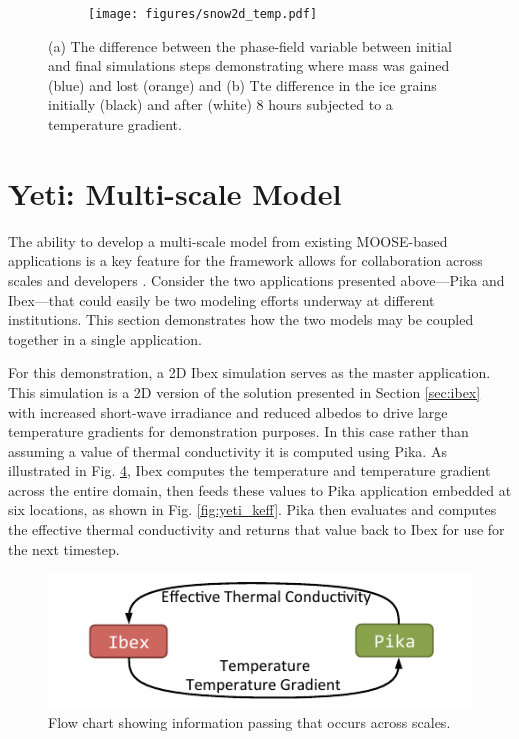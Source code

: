 \begin{figure}
\begin{subfigure}{0.44\linewidth}
  \caption{}
  \label{fig:snow2d:diff}
\end{subfigure}
\hfill
\begin{subfigure}{0.53\linewidth}
  \texttt{[image: figures/snow2d\_temp.pdf]}
  \caption{}
  \label{fig:snow2d:grains}
\end{subfigure}
\caption{(a) The difference between the phase-field variable between initial and final simulations steps demonstrating where mass was gained (blue) and lost (orange) and (b) Tte difference in the ice grains initially (black) and after (white) 8 hours subjected to a  temperature gradient.}
\end{figure}


\section{Yeti: Multi-scale Model}\label{sec:yeti}
The ability to develop a multi-scale model from existing MOOSE-based applications is a key feature for the framework allows for collaboration across scales and developers \citet{gaston2014physics}. Consider the two applications presented above---Pika and Ibex---that could easily be two modeling efforts underway at different institutions. This section demonstrates how the two models may be coupled together in a single application.

For this demonstration, a 2D Ibex simulation serves as the master application. This simulation is a 2D version of the solution presented in Section \ref{sec:ibex} with increased short-wave irradiance and reduced albedos to drive large temperature gradients for demonstration purposes. In this case rather than assuming a value of thermal conductivity it is computed using Pika. As illustrated in Fig. \ref{fig:yeti_flow}, Ibex computes the temperature and temperature gradient across the entire domain, then feeds these values to Pika application embedded at six locations, as shown in Fig. \ref{fig:yeti_keff}. Pika then evaluates and computes the effective thermal conductivity and returns that value back to Ibex for use for the next timestep.

\begin{figure}[b]
  \includegraphics[width=\linewidth]{figures/flow.pdf}
  \caption{Flow chart showing information passing that occurs across scales.}
  \label{fig:yeti_flow}
\end{figure}

